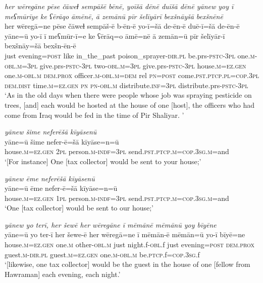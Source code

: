 \ea \label{BP.40}
\textit{her wēregāne pēse čāweɫ sempāšē bēnē, yoīšā dēnē duīšā dēnē yānew yoy ī meʕmūrīye ke ʕērāqo āmēnē, ā zemānū pīr šelīyārī bexšnāyšā bexšnēnē} \\ 
\gll her wēregā=ne pēse čāweɫ sempāš-ē b-ēn-ē yo-ī=šā de-ēn-ē duē-ī=šā de-ēn-ē yāne=ū yo-ī ī meʕmūr-ī=e ke ʕērāq=o āmē=nē ā zemān=ū pīr šelīyār-ī bexšnāy=šā bexšn-ēn-ē \\ 
 just evening\textsc{=\textsc{post}} like in\_the\_past poison\_sprayer\textsc{-dir}\textsc{.pl} be.prs\textsc{-pstc}\textsc{-3pl} one\textsc{.m}\textsc{-obl}\textsc{.m}\textsc{=3pl} give.prs\textsc{-pstc}\textsc{-3pl} two\textsc{-obl}\textsc{.m}\textsc{=3pl} give.prs\textsc{-pstc}\textsc{-3pl} house\textsc{.m}\textsc{=ez.gen} one\textsc{.m}\textsc{-obl}\textsc{.m} \textsc{dem.prox} officer\textsc{.m}\textsc{-obl}\textsc{.m}\textsc{=dem} rel \textsc{pn}\textsc{=\textsc{post}} come\textsc{.pst}\textsc{.ptcp}\textsc{.pl}\textsc{=cop}\textsc{.3pl} \textsc{dem.dist} time\textsc{.m}\textsc{=ez.gen} \textsc{pn} \textsc{pn}\textsc{-obl}\textsc{.m} distribute\textsc{.inf}\textsc{=3pl} distribute.prs\textsc{-pstc}\textsc{-3pl} \\ 
\glt `As in the old days when there were people whose job was spraying pesticide on trees, [and] each would be hosted at the house of one [host], the officers who had come from Iraq would be fed in the time of Pir Shaliyar. '
\z 
 
\ea \label{BP.41}
\textit{yānew šime neferēšā kīyāsenū} \\ 
\gll yāne=ū šime nefer-ē=šā kīyāse=n=ū \\ 
 house\textsc{.m}\textsc{=ez.gen} \textsc{2pl} person\textsc{.m}\textsc{-indf}\textsc{=3pl} send\textsc{.pst}\textsc{.ptcp}\textsc{.m}\textsc{=cop}\textsc{.3sg}\textsc{.m}=and \\ 
\glt `[For instance] One [tax collector] would be sent to your house;'
\z 
 
\ea \label{BP.42}
\textit{yānew ēme neferēšā kīyāsenū} \\ 
\gll yāne=ū ēme nefer-ē=šā kīyāse=n=ū \\ 
 house\textsc{.m}\textsc{=ez.gen} \textsc{1pl} person\textsc{.m}\textsc{-indf}\textsc{=3pl} send\textsc{.pst}\textsc{.ptcp}\textsc{.m}\textsc{=cop}\textsc{.3sg}\textsc{.m}=and \\ 
\glt `One [tax collector] would be sent to our house;'
\z 
 
\ea \label{BP.43}
\textit{yānew yo terī, her šewē her wēregāne ī mēmānē mēmānū yoy bīyēne} \\ 
\gll yāne=ū yo ter-ī her šewe-ē her wēregā=ne ī mēmān-ē mēmān=ū yo-ī bīyē=ne \\ 
 house\textsc{.m}\textsc{=ez.gen} one\textsc{.m} other\textsc{-obl}\textsc{.m} just night.f\textsc{-obl}.f just evening\textsc{=\textsc{post}} \textsc{dem.prox} guest\textsc{.m}\textsc{-dir}\textsc{.pl} guest\textsc{.m}\textsc{=ez.gen} one\textsc{.m}\textsc{-obl}\textsc{.m} be\textsc{.ptcp}.f\textsc{=cop}\textsc{.3sg}.f \\ 
\glt `[likewise, one tax collector] would be the guest in the house of one [fellow from Hawraman]  each evening, each night.'
\z 
 
